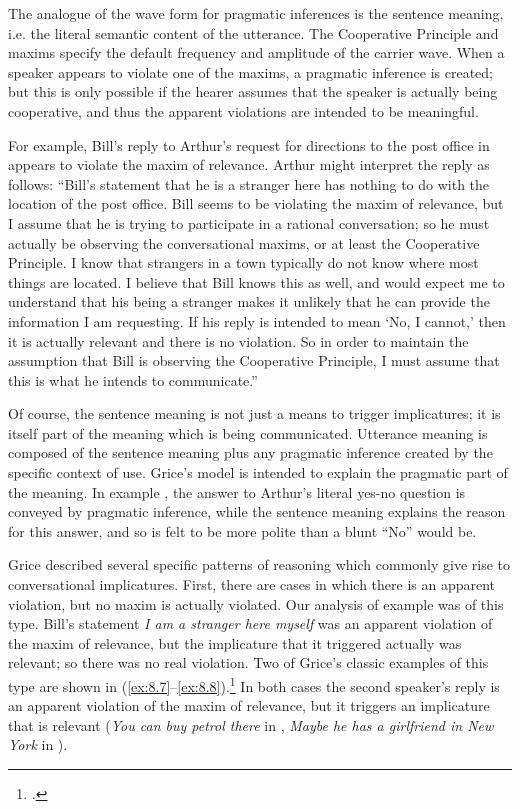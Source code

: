 The analogue of the wave form for pragmatic inferences is the sentence meaning, i.e. the literal semantic content of the utterance. The Cooperative Principle and maxims specify the default frequency and amplitude of the carrier wave. When a speaker appears to violate one of the maxims, a pragmatic inference is created; but this is only possible if the hearer assumes that the speaker is actually being cooperative, and thus the apparent violations are intended to be meaningful.



For example, Bill’s reply to Arthur’s request for directions to the post office in  appears to violate the maxim of relevance. Arthur might interpret the reply as follows: “Bill’s statement that he is a stranger here has nothing to do with the location of the post office. Bill seems to be violating the maxim of relevance, but I assume that he is trying to participate in a rational conversation; so he must actually be observing the conversational maxims, or at least the Cooperative Principle. I know that strangers in a town typically do not know where most things are located. I believe that Bill knows this as well, and would expect me to understand that his being a stranger makes it unlikely that he can provide the information I am requesting. If his reply is intended to mean ‘No, I cannot,’ then it is actually relevant and there is no violation. So in order to maintain the assumption that Bill is observing the Cooperative Principle, I must assume that this is what he intends to communicate.”



Of course, the sentence meaning is not just a means to trigger implicatures; it is itself part of the meaning which is being communicated. Utterance meaning is composed of the sentence meaning plus any pragmatic inference created by the specific context of use. Grice’s model is intended to explain the pragmatic part of the meaning. In example , the answer to Arthur’s literal yes-no question is conveyed by pragmatic inference, while the sentence meaning explains the reason for this answer, and so is felt to be more polite than a blunt “No” would be.



Grice described several specific patterns of reasoning which commonly give rise to conversational implicatures. First, there are cases in which there is an apparent violation, but no maxim is actually violated. Our analysis of example  was of this type. Bill’s statement \textit{I am a stranger here myself} was an apparent violation of the maxim of relevance, but the implicature that it triggered actually was relevant; so there was no real violation. Two of Grice’s classic examples of this type are shown in (\ref{ex:8.7}--\ref{ex:8.8}).\footnote{\citet[51]{Grice1975}.} In both cases the second speaker’s reply is an apparent violation of the maxim of relevance, but it triggers an implicature that is relevant (\textit{You can buy petrol there} in , \textit{Maybe he has a girlfriend in New York} in ).


